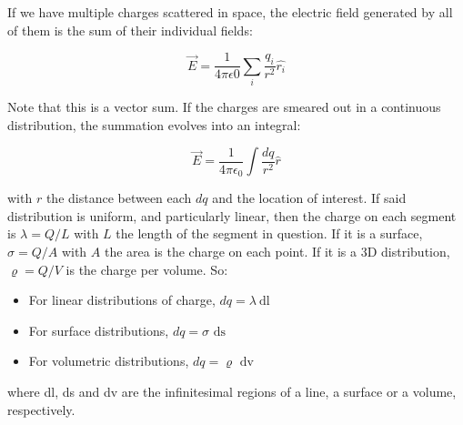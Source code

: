 \documentclass[12pt]{article}
\theoremstyle{definition}
\begin{document}
If we have multiple charges scattered in space, the electric field generated by
all of them is the sum of their individual fields: 

\begin{equation*}
    \vec{E} = \frac{1}{4\pi \epsilon 0}\sum_{i} \frac{q_i}{r^2} \hat{r_i}
\end{equation*}

Note that this is a vector sum. If the charges are smeared out in a continuous
distribution, the summation evolves into an integral:

\begin{equation*}
    \vec{E} = \frac{1}{4\pi \epsilon_0} \int \frac{dq}{r^2} \hat{r}
\end{equation*}

with $r$ the distance between each $dq$ and the location of interest. If said
distribution is uniform, and particularly linear, then the charge on each
segment is $\lambda = Q / L$ with $L$ the length of the segment in question. If
it is a surface, $\sigma = Q / A$ with $A$ the area is the charge on each point.
If it is a 3D distribution, $\varrho = Q / V$ is the charge per volume. So: 

\begin{itemize}
    \item For linear distributions of charge, $dq = \lambda ~ \text{dl}$
    \item For surface distributions, $dq = \sigma \text{ ds}$
    \item For volumetric distributions, $dq = \varrho \text{ dv}$
\end{itemize}

where dl, ds and dv are the infinitesimal regions of a line, a surface or a
volume, respectively.


\begin{center}
\end{center}
\end{document}
